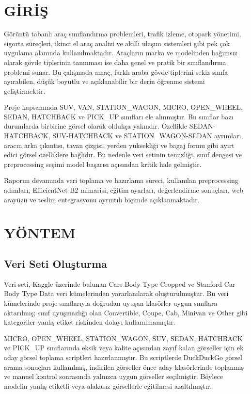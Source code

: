 \documentclass[conference]{IEEEtran}
\begin{document}
\section{GİRİŞ}

Görüntü tabanlı araç sınıflandırma problemleri, trafik izleme, otopark
yönetimi, sigorta süreçleri, ikinci el araç analizi ve akıllı ulaşım
sistemleri gibi pek çok uygulama alanında kullanılmaktadır. Araçların marka
ve modelinden bağımsız olarak gövde tiplerinin tanınması ise daha genel ve
pratik bir sınıflandırma problemi sunar. Bu çalışmada amaç, farklı araba
gövde tiplerini sekiz sınıfa ayırabilen, düşük boyutlu ve açıklanabilir bir
derin öğrenme sistemi geliştirmektir.
\vspace{0.4cm}

Proje kapsamında SUV, VAN, STATION\_WAGON, MICRO, OPEN\_WHEEL, SEDAN,
HATCHBACK ve PICK\_UP sınıfları ele alınmıştır. Bu sınıflar bazı durumlarda
birbirine görsel olarak oldukça yakındır. Özellikle SEDAN-HATCHBACK,
SUV-HATCHBACK ve STATION\_WAGON-SEDAN ayrımları, aracın arka çıkıntısı,
tavan çizgisi, yerden yüksekliği ve bagaj formu gibi ayırt edici görsel
özelliklere bağlıdır. Bu nedenle veri setinin temizliği, sınıf dengesi ve
preprocessing seçimi model başarısı açısından kritik hale gelmiştir.
\vspace{0.4cm}

Raporun devamında veri toplama ve hazırlama süreci, kullanılan
preprocessing adımları, EfficientNet-B2 mimarisi, eğitim ayarları,
değerlendirme sonuçları, web arayüzü ve teslim entegrasyonu ayrıntılı
biçimde açıklanmaktadır.

\section{YÖNTEM}

\subsection{Veri Seti Oluşturma}

Veri seti, Kaggle üzerinde bulunan Cars Body Type Cropped ve Stanford Car
Body Type Data veri kümelerinden yararlanılarak oluşturulmuştur. Bu veri
kümelerinde proje sınıflarıyla doğrudan uyuşan klasörler uygun sınıflara
aktarılmış; sınıf uyuşmazlığı olan Convertible, Coupe, Cab, Minivan ve
Other gibi kategoriler yanlış etiket riskinden dolayı kullanılmamıştır.
\vspace{0.4cm}

MICRO, OPEN\_WHEEL, STATION\_WAGON, SUV, SEDAN, HATCHBACK ve PICK\_UP
sınıflarında eksik veya kalite açısından zayıf kalan görseller için ek
aday görsel toplama scriptleri hazırlanmıştır. Bu scriptlerde DuckDuckGo
görsel arama sonuçları kullanılmış, indirilen görseller önce aday
klasörlerinde toplanmış ve manuel kontrol sonrasında yalnızca uygun
görseller seçilmiştir. Böylece modelin yanlış etiketli veya alakasız
görsellerle eğitilmesi azaltılmıştır.
\vspace{0.4cm}
\end{document}
